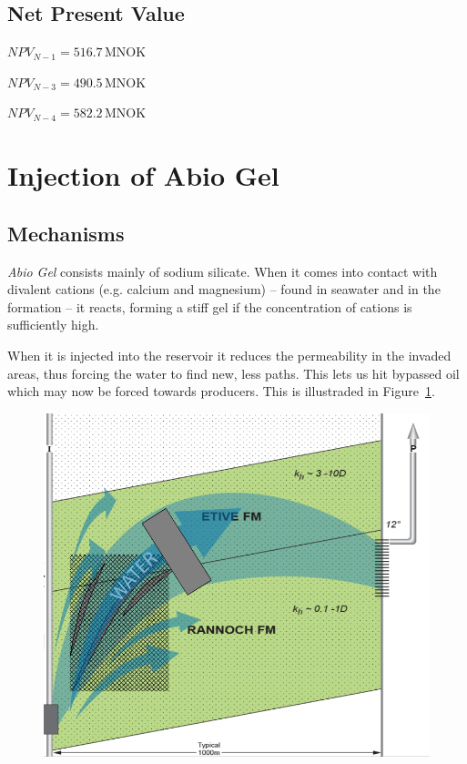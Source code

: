 \documentclass[final]{beamer}
\begin{document}
\begin{frame}[t]
\begin{multicols}{3}
\subsection{Net Present Value} %

\begin{center}
  $NPV_{N-1} = 516.7 \, \mathrm{MNOK}$

  $NPV_{N-3} = 490.5 \, \mathrm{MNOK}$

  $NPV_{N-4} = 582.2 \, \mathrm{MNOK}$
\end{center}









\section{Injection of Abio Gel} %

\subsection{Mechanisms} %
\emph{Abio Gel} consists mainly of sodium silicate. When it comes into contact with divalent cations (e.g. calcium and magnesium) -- found in seawater and in the formation -- it reacts, forming a stiff gel if the concentration of cations is sufficiently high.

When it is injected into the reservoir it reduces the permeability in the invaded areas, thus forcing the water to find new, less paths. This lets us hit bypassed oil which may now be forced towards producers. This is illustraded in Figure~\ref{fig:abio_gel}.

\begin{figure}[H]
  \centering
  \includegraphics[width=0.5\columnwidth]{images/abio_gel.png}
  \caption{}
  \label{fig:abio_gel}
\end{figure}



\end{multicols}
\end{frame}
\end{document}

